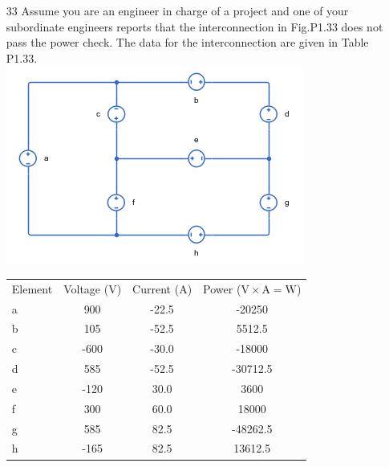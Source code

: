 \documentclass[a4paper]{article}
\begin{document}
\begin{itemize}
	\item[33] Assume you are an engineer in charge of a project and one of your subordinate engineers reports that the interconnection in Fig.P1.33 does not pass the power check. The data for the interconnection are given in Table P1.33. \\
	      \includegraphics{P1-33.png} \\
	      \begin{tabular}{l c c c}
	      	Element & Voltage (\si{\volt}) & Current (\si{\ampere}) & Power ($\si{\volt}\times\si{\ampere} = \si{\watt}$) \\
	      	a       & 900                  & -22.5                  & -20250                                              \\
	      	b       & 105                  & -52.5                  & 5512.5                                              \\
	      	c       & -600                 & -30.0                  & -18000                                              \\
	      	d       & 585                  & -52.5                  & -30712.5                                            \\
	      	e       & -120                 & 30.0                   & 3600                                                \\
	      	f       & 300                  & 60.0                   & 18000                                               \\
	      	g       & 585                  & 82.5                   & -48262.5                                            \\
	      	h       & -165                 & 82.5                   & 13612.5                                             \\

\end{tabular}
\end{itemize}
\end{document}
